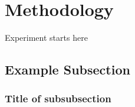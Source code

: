 
\section{Methodology}

Experiment starts here \cite{example}

\subsection{Example Subsection}

\subsubsection{Title of subsubsection}
